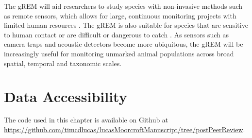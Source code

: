 The gREM will aid researchers to study species with non-invasive methods such as remote sensors, which allows for large, continuous monitoring projects with limited human resources \cite{kelly2012noninvasive}.
The gREM is also suitable  for species that are sensitive to human contact or are difficult or dangerous to catch \cite{thomas2012passive}.
As sensors such as camera traps and acoustic detectors become more ubiquitous, the gREM will be increasingly useful for monitoring unmarked animal populations across broad spatial, temporal and taxonomic scales.



\section{Data Accessibility}

The code used in this chapter is available on Github at \url{https://github.com/timcdlucas/lucasMoorcroftManuscript/tree/postPeerReview}.

